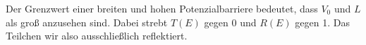 Der Grenzwert einer breiten und hohen Potenzialbarriere bedeutet, dass $V_0$
und $L$ als groß anzusehen sind. Dabei strebt $T(E)$ gegen $0$ und $R(E)$ gegen
1. Das Teilchen wir also ausschließlich reflektiert.


\IfFileExists{\bibliographyfile}{
	
}{}




